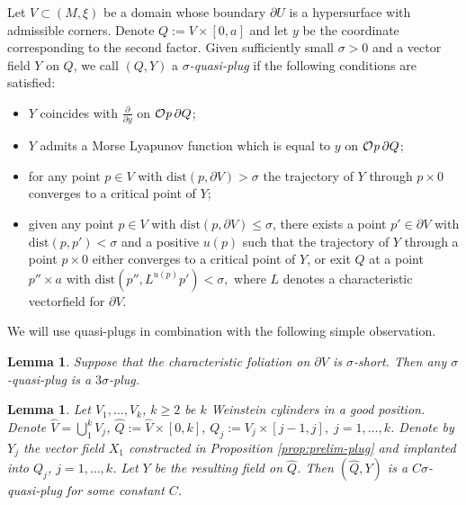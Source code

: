\documentclass[12pt]{amsart}
\theoremstyle{plain}
\newtheorem{lemma}[theorem]{Lemma}
\theoremstyle{definition}
\theoremstyle{remark}
\newcommand{\p}{\partial}
\newcommand{\wh}{\widehat}
\newcommand{\dist}{\mathrm{dist}}
\newcommand{\Op}{ {\mathcal O}{\it p}\,}
\begin{document}
  
     Let $V\subset (M,\xi)$ be a domain whose boundary $\p U$  is a hypersurface with admissible corners. Denote  $Q:=V\times[0,a]$ and let $y$ be the coordinate corresponding to the second factor.
    Given  sufficiently small   $\sigma>0 $ and  a vector field $Y$ on  $Q$,  we call $(Q,Y)$ a {\em    $ \sigma  $-quasi-plug}   if the following conditions are satisfied:
\begin{itemize}
\item[QP1.] $Y$ coincides with $\frac{\p}{\p y}$ on $ \Op\p Q$;
\item[QP2.] $Y$ admits a Morse Lyapunov function  which is equal to $y$ on $\Op\p Q$;  
\item[QP3.] for  any point $p\in V$   with $\dist (p,\p V)>\sigma$ the  trajectory of $Y$    through     $ p\times 0$ converges  to a critical point of $Y$;  
 \item[QP4.] given any  point $p\in V$ with  $\dist (p,\p V)\leq\sigma$, there exists a point $p'\in\p V$ with $\dist(p,p') < \sigma$ and a positive $u(p)$ such that   the  trajectory of $Y$    through  a  point $ p\times 0 $  either converges  to a critical point of $Y$, or exit $Q$ at a point $ p''\times a $   with  $\dist (p'', L^{u(p)}p') <\sigma,$ where $L$ denotes a characteristic vectorfield for $\p V.$  
\end{itemize}
 We will use quasi-plugs in combination with the following simple observation.
\begin{lemma}
\label{lm:remove-quasi} Suppose that the characteristic foliation on $\p V$ is $\sigma$-short. Then any $ \sigma $-quasi-plug is a $3\sigma$-plug. 
\end{lemma}
    \begin{lemma}\label{lm:good-positions-cor}
    Let $V_1,\dots, V_k$, $k\geq 2$  be $k$ Weinstein cylinders in a good position.   
  Denote $\wh V=\bigcup\limits_1^k V_j$, $\wh Q:=\wh V\times[0,k]$,
  $ Q_j:=V_j \times[j-1,j] , \; j=1,\dots,k$.  Denote by $Y_j$   the  vector field $X_1$ constructed in Proposition \ref{prop:prelim-plug} and implanted into $ Q_j$, $ j=1,\dots, k$.  Let  $Y$ be  the resulting  field on $\wh Q$.  Then $(\wh Q,Y)$ is a  $C \sigma $-quasi-plug for some constant $C$.                                                                                                                                                                                                                                                                                                                                                                                                                                                                                                            
     \end{lemma} 
\end{document}

